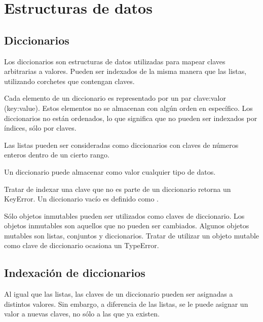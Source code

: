 \documentclass{report}
\begin{document}
{\clearpage\chapter{Estructuras de datos}

\section{Diccionarios}


Los diccionarios son estructuras de datos utilizadas para mapear claves arbitrarias a valores. Pueden ser indexados de la misma manera que las listas, utilizando corchetes que contengan claves.


Cada elemento de un diccionario es representado por un par clave:valor (key:value). Estos elementos no se almacenan con algún orden en específico. Los diccionarios no están ordenados, lo que significa que no pueden ser indexados por índices, sólo por claves.

Las listas pueden ser consideradas como diccionarios con claves de números enteros dentro de un cierto rango.


Un diccionario puede almacenar como valor cualquier tipo de datos.


Tratar de indexar una clave que no es parte de un diccionario retorna un KeyError.
Un diccionario vacío es definido como {}.


Sólo objetos inmutables pueden ser utilizados como claves de diccionario. Los objetos inmutables son aquellos que no pueden ser cambiados. Algunos objetos mutables son listas, conjuntos y diccionarios. Tratar de utilizar un objeto mutable como clave de diccionario ocasiona un TypeError.

\section{Indexación de diccionarios}

Al igual que las listas, las claves de un diccionario pueden ser asignadas a distintos valores. Sin embargo, a diferencia de las listas, se le puede asignar un valor a nuevas claves, no sólo a las que ya existen.

}
\end{document}
